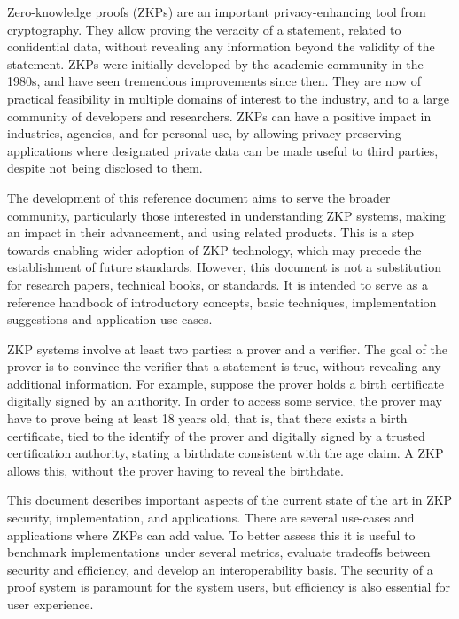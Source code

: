 \label{sec:prelim:executive-summary}

	

	Zero-knowledge proofs (ZKPs) are an important privacy-enhancing tool from cryptography. 
	They allow proving the veracity of a statement, related to confidential data, without revealing any information beyond the validity of the statement.
  ZKPs were initially developed by the academic community in the 1980s, and have seen tremendous improvements since then.
	They are now of practical feasibility in multiple domains of interest to the industry, and to a large community of developers and researchers.  
  ZKPs can have a positive impact in industries, agencies, and for personal use, by allowing privacy-preserving applications where designated private data can be made useful to third parties, despite not being disclosed to them.


	The development of this reference document aims to serve the broader community, particularly those interested in understanding ZKP systems, making an impact in their advancement, and using related products.
	This is a step towards enabling wider adoption of ZKP technology, which may precede the establishment of future standards.
	However, this document is not a substitution for research papers, technical books, or standards. 
	It is intended to serve as a reference handbook of introductory concepts, basic techniques, implementation suggestions and application use-cases. 


	ZKP systems involve at least two parties: a prover and a verifier.  
	The goal of the prover is to convince the verifier that a statement is true, without revealing any additional information.  
	For example, suppose the prover holds a birth certificate digitally signed by an authority.
	In order to access some service, the prover may have to prove being at least 18 years old, that is, that there exists a birth certificate, tied to the identify of the prover and digitally signed by a trusted certification authority, stating a birthdate consistent with the age claim.
	A ZKP allows this, without the prover having to reveal the birthdate.


	This document describes important aspects of the current state of the art in ZKP security, implementation, and applications.
	There are several use-cases and applications where ZKPs can add value.
	To better assess this it is useful to benchmark implementations under several metrics, evaluate tradeoffs between security and efficiency, and develop an interoperability basis.
    The security of a proof system is paramount for the system users, but efficiency is also essential for user experience.


